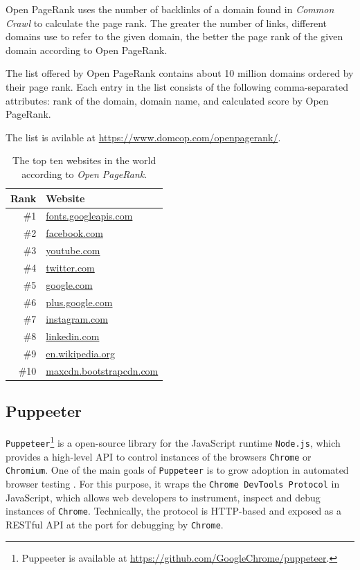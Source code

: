Open PageRank uses the number of backlinks of a domain found in \textit{Common Crawl} to calculate the page rank. The greater the number of links, different domains use to refer to the given domain, the better the page rank of the given domain according to Open PageRank.

The list offered by Open PageRank contains about 10 million domains ordered by their page rank. Each entry in the list consists of the following comma-separated attributes: rank of the domain, domain name, and calculated score by Open PageRank.

The list is avilable at \url{https://www.domcop.com/openpagerank/}.

\begin{table}
	\center
	\begin{tabular}{r l}
		\textbf{Rank} & \textbf{Website}  \\ \hline 
		\#1 & \url{fonts.googleapis.com} \\ 
		\#2 & \url{facebook.com} \\ 
		\#3 & \url{youtube.com} \\ 
		\#4 & \url{twitter.com} \\ 
		\#5 & \url{google.com} \\ 
		\#6 & \url{plus.google.com} \\ 
		\#7 & \url{instagram.com} \\ 
		\#8 & \url{linkedin.com}\\ 
		\#9 & \url{en.wikipedia.org}\\ 
		\#10 & \url{maxcdn.bootstrapcdn.com}\\
	\end{tabular}
	\caption[Top ten websites from \textit{Open PageRank}]{The top ten websites in the world according to \textit{Open PageRank}.}
	\label{tab:toptensites}
\end{table}


\subsection{Puppeeter}
\label{puppeeter}
\texttt{Puppeteer}\footnote{Puppeeter is available at \url{https://github.com/GoogleChrome/puppeteer}.} is a open-source library for the JavaScript runtime \texttt{Node.js}, which provides a high-level API to control instances of the browsers \texttt{Chrome} or \texttt{Chromium}. One of the main goals of \texttt{Puppeteer} is to grow adoption in automated browser testing \cite{PuppeteerFAQ}.  For this purpose, it wraps the \texttt{Chrome DevTools Protocol} in JavaScript, which allows web developers to instrument, inspect and debug instances of \texttt{Chrome}. Technically, the protocol is HTTP-based and exposed as a RESTful API at the port for debugging by \texttt{Chrome}.

